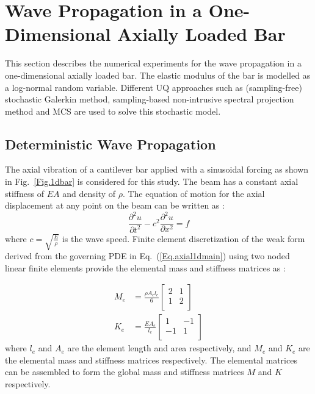 \documentclass{article}
\begin{document}
\section{Wave Propagation in a One-Dimensional Axially Loaded Bar}

This section describes the numerical experiments for the wave propagation in a one-dimensional axially loaded bar. The elastic modulus of the bar is modelled as a log-normal random variable. Different UQ approaches such as (sampling-free) stochastic Galerkin method, sampling-based non-intrusive spectral projection method and MCS are used to solve this stochastic model.


\subsection{Deterministic Wave Propagation}

The axial vibration of a cantilever bar applied with a sinusoidal forcing as shown in Fig.~\ref{Fig.1dbar} is considered for this study. The beam has a constant axial stiffness of $EA$ and density of $\rho$. The equation of motion for the axial displacement at any point on the beam can be written as \cite{humar}:
\begin{equation}\label{Eq.axial1dmain}
\frac{\partial^2 u}{\partial t^2} - c^{2} \frac{\partial^2 u}{\partial x^2} = f
\end{equation}
where $c =  \sqrt{\frac{E}{\rho}} $ is the wave speed. Finite element discretization of the weak form derived from the governing PDE 
in Eq.~(\ref{Eq.axial1dmain}) using two noded linear finite elements provide the elemental mass and stiffness matrices as \cite{bathe_1,bathe_2}:

\begin{align}
M_{e} &= \frac{\rho A_e l_e}{6}
\begin{bmatrix}
2 & 1 \\
 1 & 2 \\
\end{bmatrix}\\
K_{e} &= \frac{E A_e}{l_e}
\begin{bmatrix}
1 &-1  \\
 -1& 1 \\
\end{bmatrix}
\end{align}
where $l_e$ and $A_e$ are the element length and area respectively, and $M_{e}$ and $K_{e}$ are the elemental mass and stiffness matrices respectively. The elemental matrices can be assembled to form the global mass and stiffness matrices $M$ and $K$ respectively.
\end{document}

